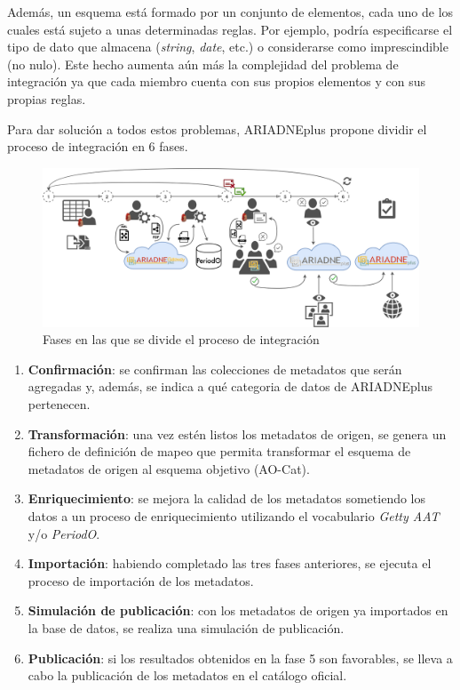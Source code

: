 \documentclass[
]{article}
\providecommand{\tightlist}{%
  \setlength{\itemsep}{0pt}\setlength{\parskip}{0pt}}
\begin{document}
Además, un esquema está formado por un conjunto de elementos, cada uno
de los cuales está sujeto a unas determinadas reglas. Por ejemplo,
podría especificarse el tipo de dato que almacena (\emph{string},
\emph{date}, etc.) o considerarse como imprescindible (no nulo). Este
hecho aumenta aún más la complejidad del problema de integración ya que
cada miembro cuenta con sus propios elementos y con sus propias reglas.

Para dar solución a todos estos problemas, ARIADNEplus propone dividir
el proceso de integración en 6 fases.

\begin{figure}
\hypertarget{integrationPhases}{%
\centering
\includegraphics{../_static/images/integrationPhases.png}
\caption{Fases en las que se divide el proceso de
integración}\label{integrationPhases}
}
\end{figure}

\begin{enumerate}
\def\labelenumi{\arabic{enumi}.}
\tightlist
\item
  \textbf{Confirmación}: se confirman las colecciones de metadatos que
  serán agregadas y, además, se indica a qué categoria de datos de
  ARIADNEplus pertenecen.
\item
  \textbf{Transformación}: una vez estén listos los metadatos de origen,
  se genera un fichero de definición de mapeo que permita transformar el
  esquema de metadatos de origen al esquema objetivo (AO-Cat).
\item
  \textbf{Enriquecimiento}: se mejora la calidad de los metadatos
  sometiendo los datos a un proceso de enriquecimiento utilizando el
  vocabulario \emph{Getty AAT} y/o \emph{PeriodO}.
\item
  \textbf{Importación}: habiendo completado las tres fases anteriores,
  se ejecuta el proceso de importación de los metadatos.
\item
  \textbf{Simulación de publicación}: con los metadatos de origen ya
  importados en la base de datos, se realiza una simulación de
  publicación.
\item
  \textbf{Publicación}: si los resultados obtenidos en la fase 5 son
  favorables, se lleva a cabo la publicación de los metadatos en el
  catálogo oficial.
\end{enumerate}
\end{document}
